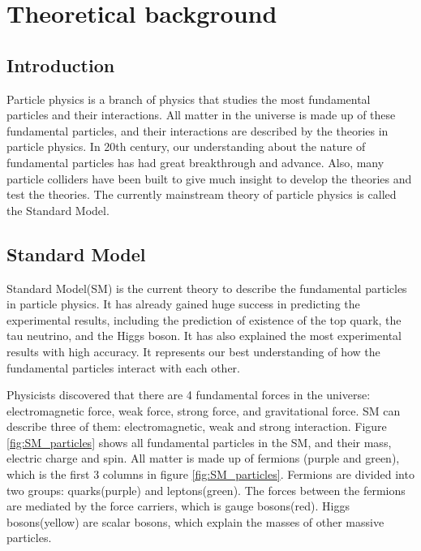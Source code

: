 \chapter{Theoretical background}
\label{ch:theory}

\section{Introduction}
Particle physics is a branch of physics that studies the most fundamental particles and their interactions.
All matter in the universe is made up of these fundamental particles, and their interactions are described by the theories in particle physics.
In 20th century, our understanding about the nature of fundamental particles has had great breakthrough and  advance.
Also, many particle colliders have been built to give much insight to develop the theories and test the theories.
The currently mainstream theory of particle physics is called the Standard Model.

\section{Standard Model}
\label{sec:Standard_Model}
Standard Model(SM) is the current theory to describe the fundamental particles in particle physics.
It has already gained huge success in predicting the experimental results, including the prediction of existence of the top quark, the tau neutrino, and the Higgs boson.
It has also explained the most experimental results with high accuracy.
It represents our best understanding of how the fundamental particles interact with each other.

Physicists discovered that there are 4 fundamental forces in the universe: electromagnetic force, weak force, strong force, and gravitational force.
SM can describe three of them: electromagnetic, weak and strong interaction.
Figure \ref{fig:SM_particles} shows all fundamental particles in the SM, and their mass, electric charge and spin.
All matter is made up of fermions (purple and green), which is the first 3 columns in figure \ref{fig:SM_particles}.
Fermions are divided into two groups: quarks(purple) and leptons(green).
The forces between the fermions are mediated by the force carriers, which is gauge bosons(red).
Higgs bosons(yellow) are scalar bosons, which explain the masses of other massive particles.

